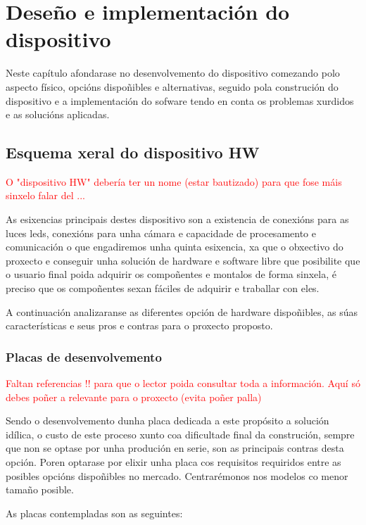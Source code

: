 \chapter{Deseño e implementación do dispositivo}
\label{chap:implementacion_dispositivo}
Neste capítulo afondarase no desenvolvemento do dispositivo comezando polo aspecto físico, opcións dispoñibles e alternativas, seguido pola construción do dispositivo e a implementación do sofware tendo en conta os problemas xurdidos e as solucións aplicadas.


\section{Esquema xeral do dispositivo HW}


\textcolor{red}{O "dispositivo HW" debería ter un nome (estar bautizado) para que fose máis sinxelo falar del ...}


As esixencias principais destes dispositivo son a existencia de conexións para as luces leds, conexións para unha cámara e capacidade de procesamento e comunicación o que engadiremos unha quinta esixencia, xa que o obxectivo do proxecto e conseguir unha solución de hardware e software libre que posibilite que o usuario final poida adquirir os compoñentes e montalos de forma sinxela, é preciso que os compoñentes sexan fáciles de adquirir e traballar con eles.

A continuación analizaranse as diferentes opción de hardware dispoñibles, as súas características e seus pros e contras para o proxecto proposto.

\subsection{Placas de desenvolvemento}

\textcolor{red}{Faltan referencias !! para que o lector poida consultar toda a información. Aquí só debes poñer a relevante para o proxecto (evita poñer palla)}

Sendo o desenvolvemento dunha placa dedicada a este propósito a solución idílica, o custo de este proceso xunto coa dificultade final da construción, sempre que non se optase por unha produción en serie, son as principais contras desta opción. Poren optarase por elixir unha placa cos requisitos requiridos entre as posibles opcións dispoñibles no mercado. Centrarémonos nos modelos co menor tamaño posible.

As placas contempladas son as seguintes:

